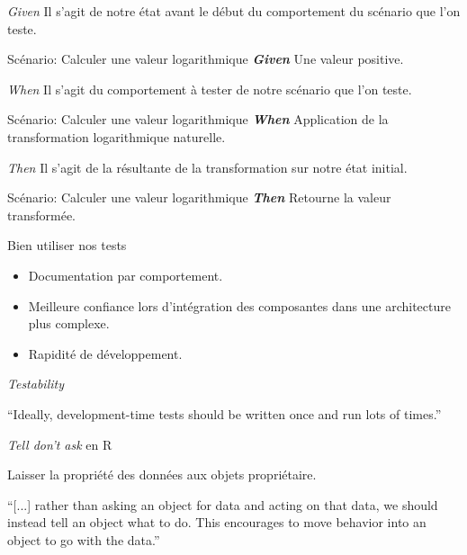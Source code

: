 \documentclass[11pt]{beamer}
\begin{document}
\begin{frame}{\textit{Given}}
Il s'agit de notre état avant le début du comportement du scénario que l'on teste.

\begin{block}{Scénario: Calculer une valeur logarithmique}
\textit{\textbf{Given}} Une valeur positive.
\end{block}
\end{frame}

\begin{frame}{\textit{When}}
Il s'agit du comportement à tester de notre scénario que l'on teste.

\begin{block}{Scénario: Calculer une valeur logarithmique}
\textit{\textbf{When}} Application de la transformation logarithmique naturelle.
\end{block}
\end{frame}

\begin{frame}{\textit{Then}}
Il s'agit de la résultante de la transformation sur notre état initial.
\begin{block}{Scénario: Calculer une valeur logarithmique}
\textit{\textbf{Then}} Retourne la valeur transformée.
\end{block}
\end{frame}

\begin{frame}{Bien utiliser nos tests}
\begin{itemize}
\item Documentation par comportement.
\item Meilleure confiance lors d'intégration des composantes dans une architecture plus complexe.
\item Rapidité de développement.
\end{itemize}
\end{frame}

\begin{frame}{\textit{Testability}}
\begin{block}{}
{\large ``Ideally, development-time tests should be written once and run lots of times.''}
\vskip5mm
\hspace*{}
\end{block}
\end{frame}

\begin{frame}{\textit{Tell don't ask} en R}

Laisser la propriété des données aux objets propriétaire.

\begin{block}{}
{\large ``[...] rather than asking an object for data and acting on that data, we should instead tell an object what to do. This encourages to move behavior into an object to go with the data.''}
\vskip5mm
\hspace*{}
\end{block}
\end{frame}
\end{document}
